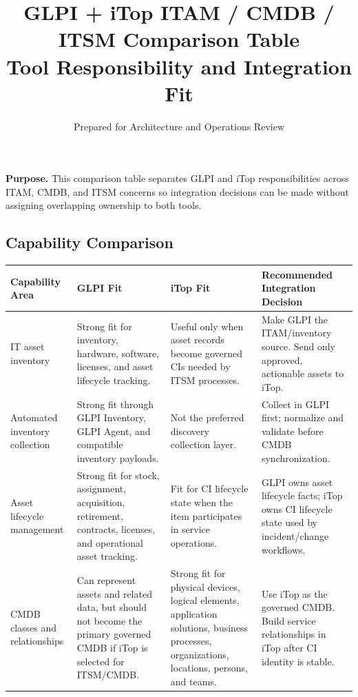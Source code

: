 \documentclass[11pt]{article}
\title{\bfseries\color{Navy} GLPI + iTop ITAM / CMDB / ITSM Comparison Table\\\large Tool Responsibility and Integration Fit}
\author{Prepared for Architecture and Operations Review}
\date{\docversion}
\begin{document}
\maketitle
\thispagestyle{fancy}

\begin{purposebox}
\textbf{Purpose.} This comparison table separates GLPI and iTop responsibilities across ITAM, CMDB, and ITSM concerns so integration decisions can be made without assigning overlapping ownership to both tools.
\end{purposebox}

\begin{landscape}
\section{Capability Comparison}
\small
\begin{longtable}{>{\raggedright\arraybackslash}p{\dimexpr 0.17978\dimexpr\linewidth-8\tabcolsep\relax\relax}>{\raggedright\arraybackslash}p{\dimexpr 0.28090\dimexpr\linewidth-8\tabcolsep\relax\relax}>{\raggedright\arraybackslash}p{\dimexpr 0.28090\dimexpr\linewidth-8\tabcolsep\relax\relax}>{\raggedright\arraybackslash}p{\dimexpr 0.25843\dimexpr\linewidth-8\tabcolsep\relax\relax}}
\toprule
\rowcolor{LightBlue}\textbf{Capability Area} & \textbf{GLPI Fit} & \textbf{iTop Fit} & \textbf{Recommended Integration Decision} \\
\midrule
IT asset inventory & Strong fit for inventory, hardware, software, licenses, and asset lifecycle tracking. & Useful only when asset records become governed CIs needed by ITSM processes. & Make GLPI the ITAM/inventory source. Send only approved, actionable assets to iTop. \\
\addlinespace
Automated inventory collection & Strong fit through GLPI Inventory, GLPI Agent, and compatible inventory payloads. & Not the preferred discovery collection layer. & Collect in GLPI first; normalize and validate before CMDB synchronization. \\
\addlinespace
Asset lifecycle management & Strong fit for stock, assignment, acquisition, retirement, contracts, licenses, and operational asset tracking. & Fit for CI lifecycle state when the item participates in service operations. & GLPI owns asset lifecycle facts; iTop owns CI lifecycle state used by incident/change workflows. \\
\addlinespace
CMDB classes and relationships & Can represent assets and related data, but should not become the primary governed CMDB if iTop is selected for ITSM/CMDB. & Strong fit for physical devices, logical elements, application solutions, business processes, organizations, locations, persons, and teams. & Use iTop as the governed CMDB. Build service relationships in iTop after CI identity is stable. \\

\end{longtable}
\end{landscape}
\end{document}

